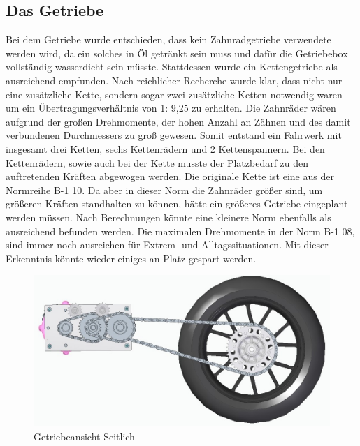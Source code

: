 \subsection{Das Getriebe}

Bei dem Getriebe wurde entschieden, dass kein Zahnradgetriebe verwendete werden wird, da ein solches in Öl getränkt sein muss und dafür die Getriebebox vollständig wasserdicht sein müsste. Stattdessen wurde ein Kettengetriebe als ausreichend empfunden. 
Nach reichlicher Recherche wurde klar, dass nicht nur eine zusätzliche Kette, sondern sogar zwei zusätzliche Ketten notwendig waren um ein Übertragungsverhältnis von 1: 9,25  zu erhalten. Die Zahnräder wären aufgrund der großen Drehmomente, der hohen Anzahl an Zähnen und des damit verbundenen Durchmessers zu groß gewesen. Somit entstand ein Fahrwerk mit insgesamt drei Ketten, sechs Kettenrädern und 2 Kettenspannern. 
Bei den Kettenrädern, sowie auch bei der Kette musste der Platzbedarf zu den auftretenden Kräften abgewogen werden. Die originale Kette ist eine aus der Normreihe B-1 10. Da aber in dieser Norm die Zahnräder größer sind, um größeren Kräften standhalten zu können, hätte ein größeres Getriebe eingeplant werden müssen. Nach Berechnungen könnte eine kleinere Norm ebenfalls als ausreichend befunden werden. Die maximalen Drehmomente in der Norm B-1 08, sind immer noch ausreichen für Extrem- und Alltagssituationen. Mit dieser Erkenntnis könnte wieder einiges an Platz gespart werden.

\newpage

\begin{figure} [H]
	\begin{center}
		\includegraphics[scale=0.5]{figures/mechanik/Getriebe.jpg}
			\caption{Getriebeansicht Seitlich}
			\label{fig:Getriebeansicht Seitlich}
	\end{center}
\end{figure}






